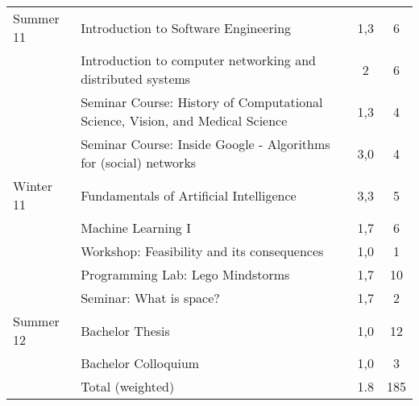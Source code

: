 \documentclass[a4paper,10pt]{article}
\begin{document}
\begin{center}
\begin{supertabular}{p{2.5cm} p{7.3cm} c c}
Summer 11& Introduction to Software Engineering& 1,3& 6 \\ 
& Introduction to computer networking and distributed systems& 2& 6 \\ 
& Seminar Course: History of Computational Science, Vision, and Medical Science& 1,3& 4 \\ 
& Seminar Course: Inside Google - Algorithms for (social) networks& 3,0& 4 \\ \hline

Winter 11& Fundamentals of Artificial Intelligence& 3,3& 5 \\
& Machine Learning I& 1,7 & 6 \\
& Workshop: Feasibility and its consequences & 1,0 & 1 \\
& Programming Lab: Lego Mindstorms & 1,7 & 10 \\
& Seminar: What is space? & 1,7 & 2 \\
 \hline
Summer 12& Bachelor Thesis & 1,0 & 12 \\
& Bachelor Colloquium & 1,0 & 3 \\ \hline\hline
& Total (weighted) & 1.8 & 185 \\
 \end{supertabular}
\end{center}
\bigskip
\newpage
\end{document}
